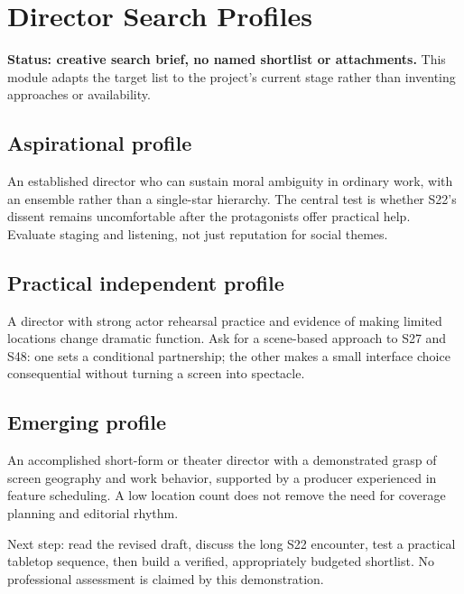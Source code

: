 \section{Director Search Profiles}
\textbf{Status: creative search brief, no named shortlist or attachments.} This module adapts the target list to the project's current stage rather than inventing approaches or availability.

\subsection{Aspirational profile}
An established director who can sustain moral ambiguity in ordinary work, with an ensemble rather than a single-star hierarchy. The central test is whether S22's dissent remains uncomfortable after the protagonists offer practical help. Evaluate staging and listening, not just reputation for social themes.

\subsection{Practical independent profile}
A director with strong actor rehearsal practice and evidence of making limited locations change dramatic function. Ask for a scene-based approach to S27 and S48: one sets a conditional partnership; the other makes a small interface choice consequential without turning a screen into spectacle.

\subsection{Emerging profile}
An accomplished short-form or theater director with a demonstrated grasp of screen geography and work behavior, supported by a producer experienced in feature scheduling. A low location count does not remove the need for coverage planning and editorial rhythm.

Next step: read the revised draft, discuss the long S22 encounter, test a practical tabletop sequence, then build a verified, appropriately budgeted shortlist. No professional assessment is claimed by this demonstration.
